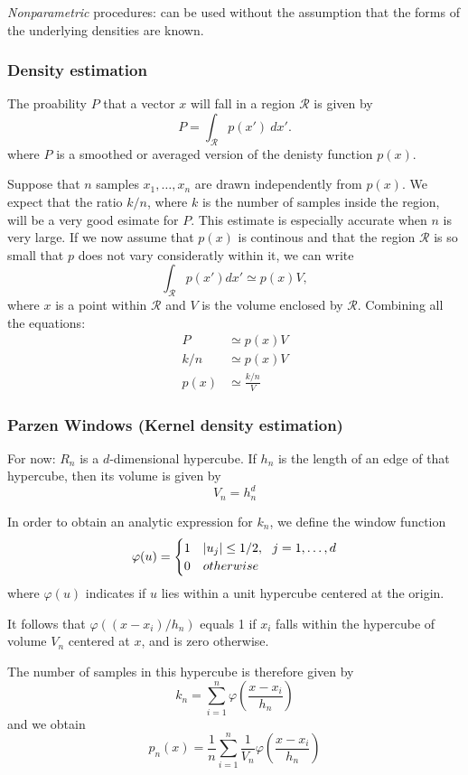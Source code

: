 \documentclass{scrartcl}
\DeclarePairedDelimiter\abs{\lvert}{\rvert}%
\begin{document}
\begin{appendices}
\textit{Nonparametric} procedures: can be used without the assumption that the forms of the underlying densities are known.

\subsubsection{Density estimation}
The proability \(P\) that a vector \(x\) will fall in a region \(\mathcal{R}\) is given by
\[P = \int_{\mathcal{R}} p(x') \ dx'.\]
where \(P\) is a smoothed or averaged version of the denisty function \(p(x)\).

Suppose that \(n\) samples \(x_1, \dots, x_n\) are drawn independently from \(p(x)\). We expect that the ratio \(k/n\), where \(k\) is the number of samples inside the region, will be a very good esimate for \(P\). This estimate is especially accurate when \(n\) is very large. If we now assume that \(p(x)\) is continous and that the region \(\mathcal{R}\) is so small that \(p\) does not vary consideratly within it, we can write
\[\int_{\mathcal{R}} p(x') dx' \simeq p(x) V,\]
where \(x\) is a point within \(\mathcal{R}\) and \(V\) is the volume enclosed by \(\mathcal{R}\). Combining all the equations:
\begin{align*}
    P &\simeq p(x) V\\
    k/n &\simeq p(x) V\\
    p(x) &\simeq \frac{k/n}{V}
\end{align*}

\subsubsection{Parzen Windows (Kernel density estimation)}
For now: \(R_n\) is a \(d\)-dimensional hypercube. If \(h_n\) is the length of an edge of that hypercube, then its volume is given by
\[V_n = h_n^d\]

In order to obtain an analytic expression for \(k_n\), we define the window function
\[\varphi(u) = 
\begin{cases} 
    1 & \abs{u_j} \leq 1/2, \ \ j = 1,\dots,d\\
    0 & otherwise
\end{cases}\]
where \(\varphi(u)\) indicates if \(u\) lies within a unit hypercube centered at the origin.

It follows that \(\varphi((x-x_i)/h_n)\) equals 1 if \(x_i\) falls within the hypercube of volume \(V_n\) centered at \(x\), and is zero otherwise.

The number of samples in this hypercube is therefore given by
\[k_n = \sum_{i=1}^{n} \varphi(\frac{x-x_i}{h_n})\]
and we obtain
\[p_n(x) = \frac{1}{n}\sum_{i=1}^{n}\frac{1}{V_n} \varphi(\frac{x-x_i}{h_n})\]


\end{appendices}
\end{document}

